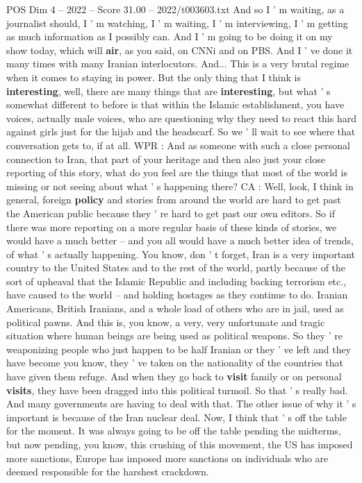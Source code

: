 \begin{textsample}{POS Dim 4 – 2022 – Score 31.00 – 2022/t003603.txt}
And so I ' m waiting, as a journalist should, I ' m watching, I ' m waiting, I ' m interviewing, I ' m getting as much information as I possibly can.
And I ' m going to be doing it on my show today, which will \textbf{air}, as you said, on CNNi and on PBS.
And I ' ve done it many times with many Iranian interlocutors.
And...
This is a very brutal regime when it comes to staying in power.
But the only thing that I think is \textbf{interesting}, well, there are many things that are \textbf{interesting}, but what ' s somewhat different to before is that within the Islamic establishment, you have voices, actually male voices, who are questioning why they need to react this hard against girls just for the hijab and the headscarf.
So we ' ll wait to see where that conversation gets to, if at all.
WPR : And as someone with such a close personal connection to Iran, that part of your heritage and then also just your close reporting of this story, what do you feel are the things that most of the world is missing or not seeing about what ' s happening there?
CA : Well, look, I think in general, foreign \textbf{policy} and stories from around the world are hard to get past the American public because they ' re hard to get past our own editors.
So if there was more reporting on a more regular basis of these kinds of stories, we would have a much better -- and you all would have a much better idea of trends, of what ' s actually happening.
You know, don ' t forget, Iran is a very important country to the United States and to the rest of the world, partly because of the sort of upheaval that the Islamic Republic and including backing terrorism etc., have caused to the world -- and holding hostages as they continue to do.
Iranian Americans, British Iranians, and a whole load of others who are in jail, used as political pawns.
And this is, you know, a very, very unfortunate and tragic situation where human beings are being used as political weapons.
So they ' re weaponizing people who just happen to be half Iranian or they ' ve left and they have become you know, they ' ve taken on the nationality of the countries that have given them refuge.
And when they go back to \textbf{visit} family or on personal \textbf{visits}, they have been dragged into this political turmoil.
So that ' s really bad.
And many governments are having to deal with that.
The other issue of why it ' s important is because of the Iran nuclear deal.
Now, I think that ' s off the table for the moment.
It was always going to be off the table pending the midterms, but now pending, you know, this crushing of this movement, the US has imposed more sanctions, Europe has imposed more sanctions on individuals who are deemed responsible for the harshest crackdown.

\end{textsample}
